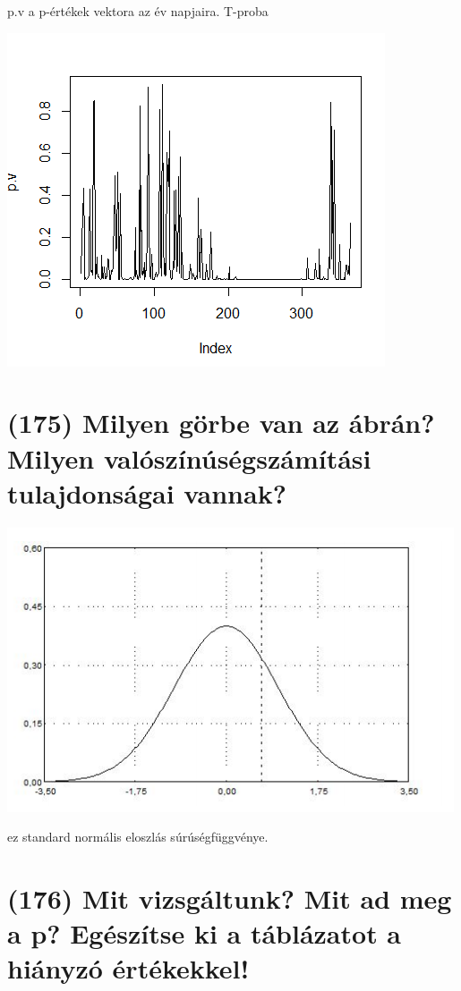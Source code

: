 \documentclass[12p]{article}
\begin{document}
p.v a p-értékek vektora az év napjaira. T-proba

\includegraphics{pv}

\section{(175) Milyen görbe van az ábrán? Milyen valószínúségszámítási tulajdonságai vannak?}

\includegraphics{gorbe}

ez standard normális eloszlás súrúségfüggvénye.


\section{(176) Mit vizsgáltunk? Mit ad meg a p? Egészítse ki a táblázatot a hiányzó értékekkel!}
\end{document}

